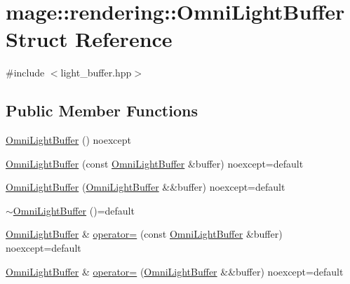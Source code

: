 \hypertarget{structmage_1_1rendering_1_1_omni_light_buffer}{}\section{mage\+:\+:rendering\+:\+:Omni\+Light\+Buffer Struct Reference}
\label{structmage_1_1rendering_1_1_omni_light_buffer}


{\ttfamily \#include $<$light\+\_\+buffer.\+hpp$>$}

\subsection*{Public Member Functions}
\begin{DoxyCompactItemize}
\item 
\mbox{\hyperlink{structmage_1_1rendering_1_1_omni_light_buffer_a7429503e161d324c66ecad2250bc69a2}{Omni\+Light\+Buffer}} () noexcept
\item 
\mbox{\hyperlink{structmage_1_1rendering_1_1_omni_light_buffer_a716417506a93d27a0093b408e88f92e4}{Omni\+Light\+Buffer}} (const \mbox{\hyperlink{structmage_1_1rendering_1_1_omni_light_buffer}{Omni\+Light\+Buffer}} \&buffer) noexcept=default
\item 
\mbox{\hyperlink{structmage_1_1rendering_1_1_omni_light_buffer_a8a1a458735f88d1dbd86590f1807c0a4}{Omni\+Light\+Buffer}} (\mbox{\hyperlink{structmage_1_1rendering_1_1_omni_light_buffer}{Omni\+Light\+Buffer}} \&\&buffer) noexcept=default
\item 
\mbox{\hyperlink{structmage_1_1rendering_1_1_omni_light_buffer_a67eee7a5d21a124ffe74cd5ae94196b6}{$\sim$\+Omni\+Light\+Buffer}} ()=default
\item 
\mbox{\hyperlink{structmage_1_1rendering_1_1_omni_light_buffer}{Omni\+Light\+Buffer}} \& \mbox{\hyperlink{structmage_1_1rendering_1_1_omni_light_buffer_a915b047abdc1068279b8308b189b60f5}{operator=}} (const \mbox{\hyperlink{structmage_1_1rendering_1_1_omni_light_buffer}{Omni\+Light\+Buffer}} \&buffer) noexcept=default
\item 
\mbox{\hyperlink{structmage_1_1rendering_1_1_omni_light_buffer}{Omni\+Light\+Buffer}} \& \mbox{\hyperlink{structmage_1_1rendering_1_1_omni_light_buffer_a5dc568c33ce2343aaf76c82aaaffa921}{operator=}} (\mbox{\hyperlink{structmage_1_1rendering_1_1_omni_light_buffer}{Omni\+Light\+Buffer}} \&\&buffer) noexcept=default
\end{DoxyCompactItemize}
